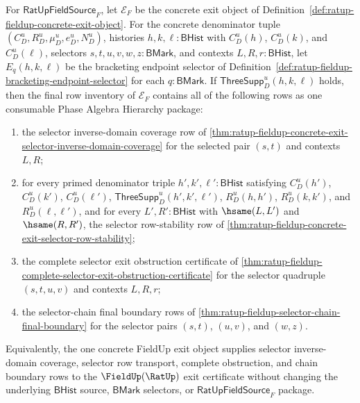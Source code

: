 \begin{theorem}
\label{thm:ratup-fieldup-final-row-inventory-coverage}
For $\mathsf{RatUpFieldSource}_F$, let $\mathcal E_F$ be the concrete exit
object of Definition~\ref{def:ratup-fieldup-concrete-exit-object}. For the
concrete denominator tuple $(C_D^u,R_D^u,\mu_D^u,e_D^u,N_D^u)$, histories
$h,k,\ell:\mathsf{BHist}$ with $C_D^u(h)$, $C_D^u(k)$, and $C_D^u(\ell)$,
selectors $s,t,u,v,w,z:\mathsf{BMark}$, and contexts
$L,R,r:\mathsf{BHist}$, let $E_q(h,k,\ell)$ be the bracketing endpoint
selector of Definition~\ref{def:ratup-fieldup-bracketing-endpoint-selector}
for each $q:\mathsf{BMark}$. If $\mathsf{ThreeSupp}_D^u(h,k,\ell)$ holds, then
the final row inventory of $\mathcal E_F$ contains all of the following rows as
one consumable Phase Algebra Hierarchy package:
\begin{enumerate}
  \item the selector inverse-domain coverage row of
  \autoref{thm:ratup-fieldup-concrete-exit-selector-inverse-domain-coverage}
  for the selected pair $(s,t)$ and contexts $L,R$;
  \item for every primed denominator triple
  $h',k',\ell':\mathsf{BHist}$ satisfying $C_D^u(h')$, $C_D^u(k')$,
  $C_D^u(\ell')$, $\mathsf{ThreeSupp}_D^u(h',k',\ell')$,
  $R_D^u(h,h')$, $R_D^u(k,k')$, and $R_D^u(\ell,\ell')$, and for every
  $L',R':\mathsf{BHist}$ with $\hsame(L,L')$ and $\hsame(R,R')$, the selector
  row-stability row of
  \autoref{thm:ratup-fieldup-concrete-exit-selector-row-stability};
  \item the complete selector exit obstruction certificate of
  \autoref{thm:ratup-fieldup-complete-selector-exit-obstruction-certificate}
  for the selector quadruple $(s,t,u,v)$ and contexts $L,R,r$;
  \item the selector-chain final boundary rows of
  \autoref{thm:ratup-fieldup-selector-chain-final-boundary} for the selector
  pairs $(s,t)$, $(u,v)$, and $(w,z)$.
\end{enumerate}
Equivalently, the one concrete FieldUp exit object supplies selector
inverse-domain coverage, selector row transport, complete obstruction, and
chain boundary rows to the $\FieldUp(\RatUp)$ exit certificate without changing
the underlying $\mathsf{BHist}$ source, $\mathsf{BMark}$ selectors, or
$\mathsf{RatUpFieldSource}_F$ package.
\end{theorem}
